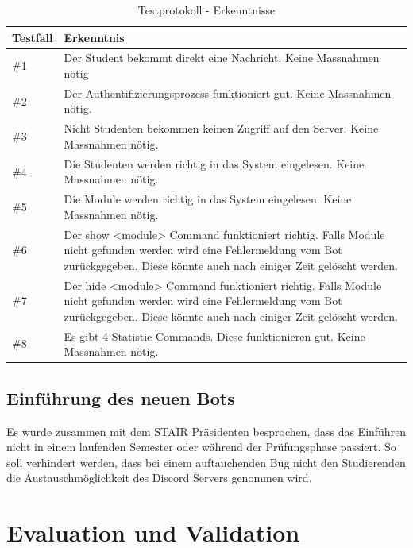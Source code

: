 \documentclass[a4paper, table]{article}
\begin{document}
\begin{table}[h]
    \centering
    \begin{tabular}{|l|p{30em}|}
        \hline
        \rowcolor[gray]{.9} Testfall & Erkenntnis \\
        \hline
        \#1 & Der Student bekommt direkt eine Nachricht. Keine Massnahmen nötig \\
        \hline
        \#2 & Der Authentifizierungsprozess funktioniert gut. Keine Massnahmen nötig. \\
        \hline
        \#3 & Nicht Studenten bekommen keinen Zugriff auf den Server. Keine Massnahmen nötig. \\
        \hline
        \#4 & Die Studenten werden richtig in das System eingelesen. Keine Massnahmen nötig. \\
        \hline
        \#5 & Die Module werden richtig in das System eingelesen. Keine Massnahmen nötig. \\
        \hline
        \#6 & 
            Der show <module> Command funktioniert richtig.
            Falls Module nicht gefunden werden wird eine Fehlermeldung vom Bot zurückgegeben.
            Diese könnte auch nach einiger Zeit gelöscht werden. \\
        \hline
        \#7 & 
            Der hide <module> Command funktioniert richtig.
            Falls Module nicht gefunden werden wird eine Fehlermeldung vom Bot zurückgegeben.
            Diese könnte auch nach einiger Zeit gelöscht werden. \\
        \#8 & Es gibt 4 Statistic Commands. Diese funktionieren gut. Keine Massnahmen nötig. \\
        \hline
    \end{tabular}
    \caption{Testprotokoll - Erkenntnisse}
    \label{tab: test-protocol-knowledge}
\end{table}

\subsection{Einführung des neuen Bots}
Es wurde zusammen mit dem STAIR Präsidenten besprochen, dass das Einführen nicht in einem laufenden Semester oder während der Prüfungsphase passiert.
So soll verhindert werden, dass bei einem auftauchenden Bug nicht den Studierenden die Austauschmöglichkeit des Discord Servers genommen wird.

\newpage
\section{Evaluation und Validation}
\end{document}
